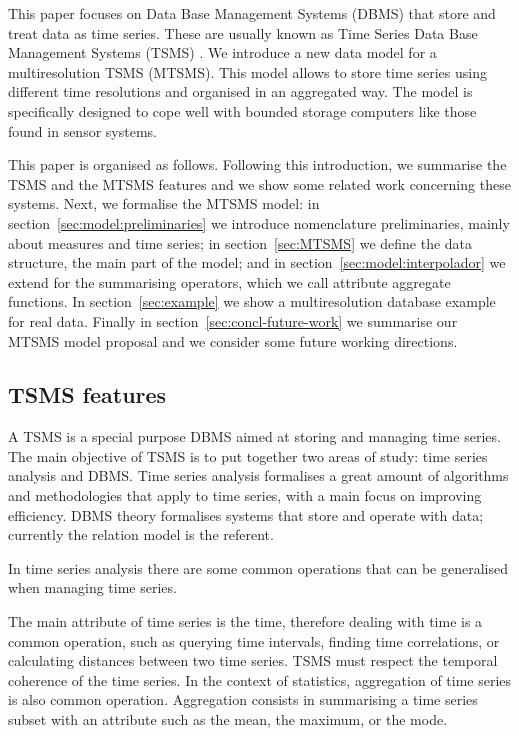 
This paper focuses on Data Base Management Systems (DBMS) that store
and treat data as time series. These are usually known as Time Series
Data Base Management Systems (TSMS) \cite{dreyer94}.  We introduce a
new data model for a multiresolution TSMS (MTSMS). This model allows
to store time series using different time resolutions and organised in
an aggregated way. The model is specifically designed to cope well
with bounded storage computers like those found in sensor systems.


This paper is organised as follows. Following this introduction, we
summarise the TSMS and the MTSMS features and we show some related
work concerning these systems.  Next, we formalise the MTSMS model: in
section~\ref{sec:model:preliminaries} we introduce nomenclature
preliminaries, mainly about measures and time series; in
section~\ref{sec:MTSMS} we define the data structure, the main part of
the model; and in section~\ref{sec:model:interpolador} we extend for
the summarising operators, which we call attribute aggregate
functions. In section~\ref{sec:example} we show a multiresolution
database example for real data. Finally in
section~\ref{sec:concl-future-work} we summarise our MTSMS model
proposal and we consider some future working directions.



\subsection{TSMS features}

A TSMS is a special purpose DBMS aimed at storing and managing time
series. The main objective of TSMS is to put together two areas of
study: time series analysis and DBMS.  Time series analysis formalises
a great amount of algorithms and methodologies that apply to time
series, with a main focus on improving efficiency. DBMS theory
formalises systems that store and operate with data; currently the
relation model \cite{date:introduction} is the referent.

In time series analysis there are some common operations that can be
generalised when managing time series.

The main attribute of time series is the time, therefore dealing with
time is a common operation, such as querying time intervals, finding
time correlations, or calculating distances between two time
series. TSMS must respect the temporal coherence of the time series.
In the context of statistics, aggregation of time series is also
common operation. Aggregation consists in summarising a time series
subset with an attribute such as the mean, the maximum, or the mode.

